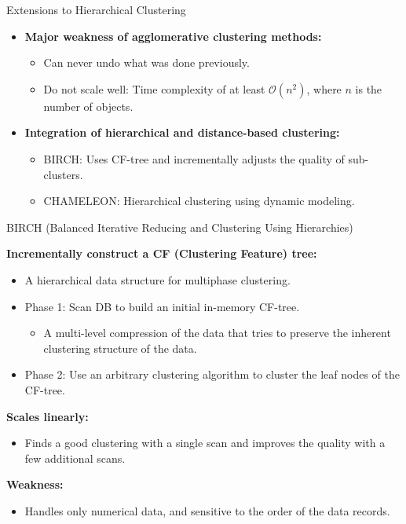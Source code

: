 \begin{frame}{Extensions to Hierarchical Clustering}
	\begin{itemize}
		\item \textbf{Major weakness of agglomerative clustering methods:}
		      \begin{itemize}
			      \item Can never undo what was done previously.
			      \item Do not scale well: Time complexity of at least
			            $\mathcal{O}(n^2)$, where $n$ is the number of objects.
		      \end{itemize}
		\item \textbf{Integration of hierarchical and distance-based
			      clustering:}
		      \begin{itemize}
			      \item BIRCH: Uses CF-tree and incrementally adjusts the
			            quality of sub-clusters.
			      \item CHAMELEON: Hierarchical clustering using dynamic
			            modeling.
		      \end{itemize}
	\end{itemize}
\end{frame}

\begin{frame}{BIRCH (Balanced Iterative Reducing and Clustering Using
		Hierarchies)}

	\textbf{Incrementally construct a CF (Clustering Feature) tree:}
	\begin{itemize}
		\item A hierarchical data structure for multiphase clustering.
		\item Phase 1: Scan DB to build an initial in-memory CF-tree.
		      \begin{itemize}
			      \item A multi-level compression of the data that tries to
			            preserve the inherent clustering structure of the data.
		      \end{itemize}
		\item Phase 2: Use an arbitrary clustering algorithm to cluster the
		      leaf nodes of the CF-tree.
	\end{itemize}
	\textbf{Scales linearly:}
	\begin{itemize}
		\item Finds a good clustering with a single scan and improves the
		      quality with a few additional scans.
	\end{itemize}
	\textbf{Weakness:}
	\begin{itemize}
		\item Handles only numerical data, and sensitive to the order of
		      the data records.
	\end{itemize}
\end{frame}

